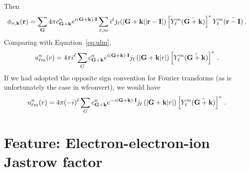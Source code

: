 Then
\begin{equation}
\phi_{n,\mathbf{k}}(\mathbf{r}) =  \sum_{\mathbf{G}} 4\pi c_{\mathbf{G}+\mathbf{k}}^n
e^{i(\mathbf{G}+\mathbf{k})\cdot\mathbf{I}} \sum_{\ell,m}
  i^\ell j_\ell(|\mathbf{G} +\mathbf{k}||\mathbf{r}-\mathbf{I}|)
  \left[Y_\ell^m(\hat{\mathbf{G}+\mathbf{k}})\right]^*
Y_\ell^m(\hat{\mathbf{r} - \mathbf{I}})\:.
\end{equation}
Comparing with Equation~\ref{eq:ulm},
\begin{equation}
u_{\ell m}^n(r) = 4\pi i^\ell \sum_G c_{\mathbf{G}+\mathbf{k}}^n e^{i(\mathbf{G}+\mathbf{k})\cdot\mathbf{I}}  j_\ell\left(|\mathbf{G} + \mathbf{k}|r|\right)
\left[Y_\ell^m(\hat{\mathbf{G} + \mathbf{k}})\right]^*\:.
\end{equation}
If we had adopted the opposite sign convention for Fourier transforms
(as is unfortunately the case in wfconvert), we would have
\begin{equation}
u_{\ell m}^n(r) = 4\pi (-i)^\ell \sum_G c_{\mathbf{G}+\mathbf{k}}^n e^{-i(\mathbf{G}+\mathbf{k})\cdot\mathbf{I}}  j_\ell\left(|\mathbf{G} + \mathbf{k}|r|\right)
\left[Y_\ell^m(\hat{\mathbf{G} + \mathbf{k}})\right]^*\:.
\end{equation}



\section{Feature: Electron-electron-ion Jastrow factor}


